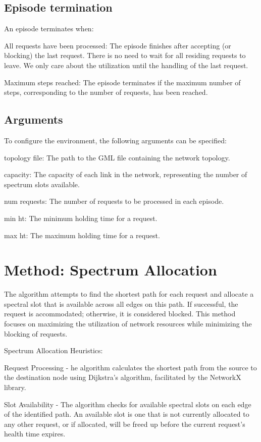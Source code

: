 \documentclass[conference]{IEEEtran}
\begin{document}
\subsection{Episode termination}
An episode terminates when:

All requests have been processed: The episode finishes after accepting (or blocking) the last request. There is no need to wait for all residing requests to leave. We only care about the utilization until the handling of the last request.

Maximum steps reached: The episode terminates if the maximum number of steps, corresponding to the number of requests, has been reached.

\subsection{Arguments}
To configure the environment, the following arguments can be specified:

topology file: The path to the GML file containing the network topology.

capacity: The capacity of each link in the network, representing the number of spectrum slots available.

num requests: The number of requests to be processed in each episode.

min ht: The minimum holding time for a request.

max ht: The maximum holding time for a request.

\section{Method: Spectrum Allocation}

The algorithm attempts to find the shortest path for each request and allocate a spectral slot that is available across all edges on this path. If successful, the request is accommodated; otherwise, it is considered blocked. This method focuses on maximizing the utilization of network resources while minimizing the blocking of requests.
\newline

Spectrum Allocation Heuristics:

Request Processing - he algorithm calculates the shortest path from the source to the destination node using Dijkstra's algorithm, facilitated by the NetworkX library.

Slot Availability - The algorithm checks for available spectral slots on each edge of the identified path. An available slot is one that is not currently allocated to any other request, or if allocated, will be freed up before the current request's health time expires.
\end{document}
